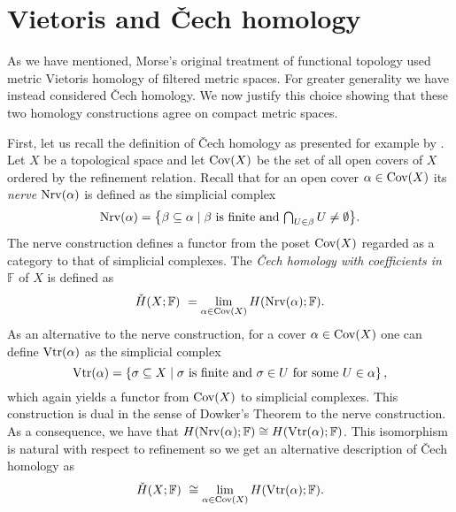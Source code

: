 
\section{Vietoris and \v{C}ech homology} \label{s:vietoris}

As we have mentioned, Morse's original treatment of functional topology used metric Vietoris homology \cite{MR1512371} of filtered metric spaces. 
For greater generality we have instead considered \v{C}ech homology.
We now justify this choice showing that these two homology constructions agree on compact metric spaces.

First, let us recall the definition of \v{C}ech homology as presented for example by \citet[Section IX--X]{MR0050886}.
Let $X$ be a topological space and let $\operatorname{Cov}(X)$ be the set of all open covers of $X$ ordered by the refinement relation. 
Recall that for an open cover $\alpha \in \operatorname{Cov}(X)$ its \emph{nerve} $\operatorname{Nrv}(\alpha)$ is defined as the simplicial complex
\begin{equation*}
\operatorname{Nrv}(\alpha) =
\big\{ \beta \subseteq \alpha \mid \beta \text{ is finite and } \textstyle{\bigcap_{U \in \beta}} \, U \neq \emptyset \big\}.
\end{equation*}
The nerve construction defines a functor from the poset $\operatorname{Cov}(X)$ regarded as a category to that of simplicial complexes. 
The \emph{\v{C}ech homology with coefficients in $\mathbb{F}$} of $X$ is defined as
\begin{equation*}
\check{H}(X; \mathbb{F}) \ =
\lim_{\alpha \in \operatorname{Cov}(X)} H(\operatorname{Nrv}(\alpha); \mathbb{F}).
\end{equation*}
As an alternative to the nerve construction, for a cover $\alpha \in \operatorname{Cov}(X)$ one can define $\operatorname{Vtr}(\alpha)$ as the simplicial complex
\begin{equation*}
\operatorname{Vtr} (\alpha) = \left\{ \sigma \subseteq X \mid \sigma \text{ is finite and } \sigma \in U \text{ for some } U \in \alpha  \right\},
\end{equation*}
which again yields a functor from $\operatorname{Cov}(X)$ to simplicial complexes.
This construction is dual in the sense of Dowker's Theorem \cite{Dowker.1952} to the nerve construction.
As a consequence, we have that $H (\operatorname{Nrv} (\alpha); \mathbb{F}) \cong H (\operatorname{Vtr} (\alpha); \mathbb{F})$.
This isomorphism is natural with respect to refinement so we get an alternative description of \v{C}ech homology as 
\begin{equation*}
\check{H} (X; \mathbb{F}) \ \cong
\lim_{\alpha \in \operatorname{Cov} (X)} H (\operatorname{Vtr} (\alpha); \mathbb{F}).
\end{equation*}

